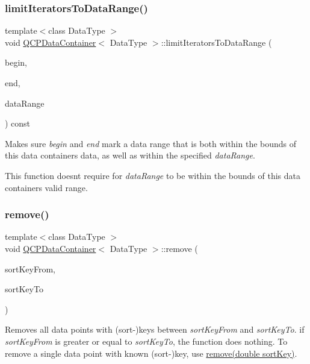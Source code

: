 \subsubsection{\texorpdfstring{limit\+Iterators\+To\+Data\+Range()}{limitIteratorsToDataRange()}}
{\footnotesize\ttfamily template$<$class Data\+Type $>$ \\
void \hyperlink{class_q_c_p_data_container}{Q\+C\+P\+Data\+Container}$<$ Data\+Type $>$\+::limit\+Iterators\+To\+Data\+Range (\begin{DoxyParamCaption}\item[{const\+\_\+iterator \&}]{begin,  }\item[{const\+\_\+iterator \&}]{end,  }\item[{const \hyperlink{class_q_c_p_data_range}{Q\+C\+P\+Data\+Range} \&}]{data\+Range }\end{DoxyParamCaption}) const}

Makes sure {\itshape begin} and {\itshape end} mark a data range that is both within the bounds of this data container\textquotesingle{}s data, as well as within the specified {\itshape data\+Range}.

This function doesn\textquotesingle{}t require for {\itshape data\+Range} to be within the bounds of this data container\textquotesingle{}s valid range. \mbox{\label{class_q_c_p_data_container_ae5f569a120648b167efa78835f12fd38}} 
\subsubsection{\texorpdfstring{remove()}{remove()}\hspace{0.1cm}{\footnotesize\ttfamily [1/2]}}
{\footnotesize\ttfamily template$<$class Data\+Type $>$ \\
void \hyperlink{class_q_c_p_data_container}{Q\+C\+P\+Data\+Container}$<$ Data\+Type $>$\+::remove (\begin{DoxyParamCaption}\item[{double}]{sort\+Key\+From,  }\item[{double}]{sort\+Key\+To }\end{DoxyParamCaption})}

Removes all data points with (sort-\/)keys between {\itshape sort\+Key\+From} and {\itshape sort\+Key\+To}. if {\itshape sort\+Key\+From} is greater or equal to {\itshape sort\+Key\+To}, the function does nothing. To remove a single data point with known (sort-\/)key, use \hyperlink{class_q_c_p_data_container_a2dbded7f0732bacf9db48fdfbbb620bc}{remove(double sort\+Key)}.

